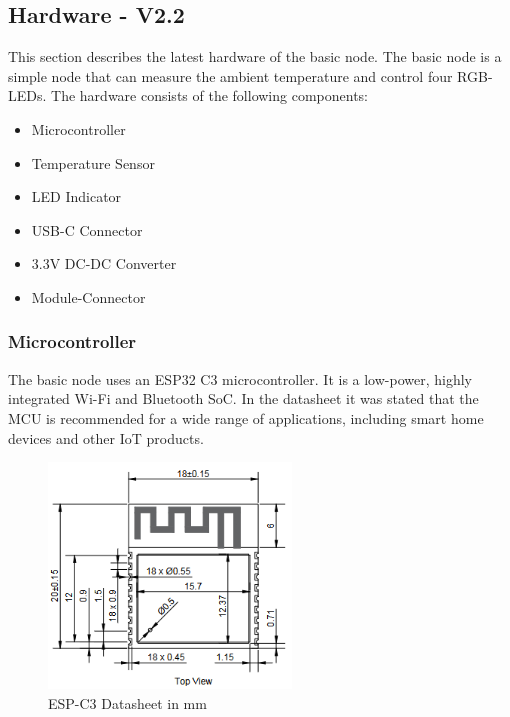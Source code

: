 
\subsection{Hardware - V2.2}

    This section describes the latest hardware of the basic node. The basic node is a 
    simple node that can measure the ambient temperature and control four RGB-LEDs.
    The hardware consists of the following components:

    \begin{itemize}
        \item Microcontroller
        \item Temperature Sensor
        \item LED Indicator
        \item USB-C Connector
        \item 3.3V DC-DC Converter
        \item Module-Connector
    \end{itemize}
    \newpage

    \subsubsection{Microcontroller}
        The basic node uses an ESP32 C3 microcontroller. It is a low-power, highly
        integrated Wi-Fi and Bluetooth SoC. In the datasheet it was stated that the
        MCU is recommended for a wide range of applications, including smart home devices 
        and other IoT products.

        \begin{figure}[H]
            \centering
            \includegraphics[height = 6cm]{assets/HW/ESP32-C3-sheet.png}
            \caption{ESP-C3 Datasheet in mm}
            
        \end{figure}

